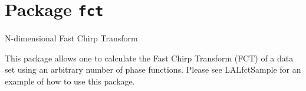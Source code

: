 \documentclass[oneside]{book}
\begin{document}
\tableofcontents

\chapter{Package \texttt{fct}}

N-dimensional Fast Chirp Transform

This package allows one to calculate the Fast Chirp Transform (FCT) of a
data set using an arbitrary number of phase functions.  Please see
LALfctSample for an example of how to use this package.

\newpage

\newpage



\printindex
\end{document}
